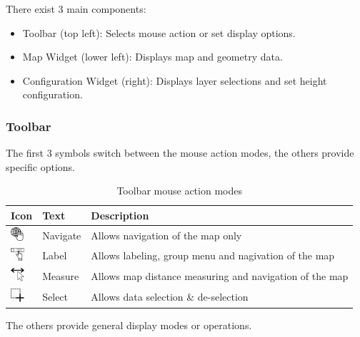 There exist 3 main components:
\begin{itemize}
 \item Toolbar (top left): Selects mouse action or set display options.
 \item Map Widget (lower left): Displays map and geometry data.
 \item Configuration Widget (right): Displays layer selections and set height configuration.
\end{itemize}

\subsubsection{Toolbar}

The first 3 symbols switch between the mouse action modes, the others provide specific options.

\begin{table}[H]
  \center
  \begin{tabular}{ | l | l | l |}
    \hline
    \textbf{Icon} & \textbf{Text} &  \textbf{Description} \\ \hline
    \includegraphics[width=0.5cm]{../../data/icons/navigate.png} & Navigate & Allows navigation of the map only \\ \hline
    \includegraphics[width=0.5cm]{../../data/icons/label_action.png} & Label & Allows labeling, group menu and nagivation of the map \\ \hline
    \includegraphics[width=0.5cm]{../../data/icons/measure_action.png} & Measure & Allows map distance measuring and navigation of the map \\ \hline
    \includegraphics[width=0.5cm]{../../data/icons/select_action.png} & Select & Allows data selection \& de-selection \\ \hline
  \end{tabular}
  \caption{Toolbar mouse action modes}
\end{table}

The others provide general display modes or operations.

